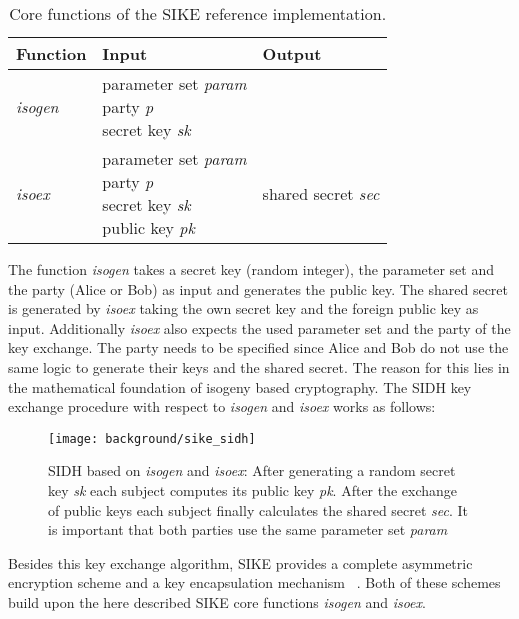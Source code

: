 \begin{table}[H]
  \centering
  \begin{tabular}{|K{3cm}|K{4cm}|K{4cm}|}
	\hline
      \textbf{Function} & \textbf{Input} & \textbf{Output} \\
	\hline
      \textit{isogen} & \parbox[t]{4cm}{\centering parameter set \textit{param}\\party \textit{p}\\ secret key \textit{sk}} &  \\
     \hline
      \textit{isoex} & \parbox[t]{4cm}{\centering parameter set \textit{param}\\party \textit{p}\\ secret key \textit{sk}\\ public key \textit{pk}} & shared secret \textit{sec}\\
     \hline
  \end{tabular}
   \caption[Core functions of the \gls{SIKE} reference implementation]{Core functions of the \gls{SIKE} reference implementation.}\label{tab:sike_core_functions}
\end{table}
The function \textit{isogen} takes a secret key (random integer), the parameter set and the party (Alice or Bob) as input and generates the public key. The shared secret is generated by \textit{isoex} taking the own secret key and the foreign public key as input. Additionally \textit{isoex} also expects the used parameter set and the party of the key exchange. The party needs to be specified since Alice and Bob do not use the same logic to generate their keys and the shared secret. The reason for this lies in the mathematical foundation of isogeny based cryptography. The \gls{SIDH} key exchange procedure with respect to \textit{isogen} and \textit{isoex} works as follows:
\begin{figure}[H]
  \centering
  \texttt{[image: background/sike\_sidh]}
  \caption[\gls{SIDH} based on \textit{isogen} and \textit{isoex}]{\gls{SIDH} based on \textit{isogen} and \textit{isoex}: After generating a random secret key \textit{sk} each subject computes its public key \textit{pk}. After the exchange of public keys each subject finally calculates the shared secret \textit{sec}. It is important that both parties use the same parameter set \textit{param}} \label{fig:sike-sidh}
\end{figure}
Besides this key exchange algorithm, \gls{SIKE} provides a complete asymmetric encryption scheme  and a key encapsulation mechanism  ~\parencite{sike2020spec}. Both of these schemes build upon the here described \gls{SIKE} core functions \textit{isogen} and \textit{isoex}.

